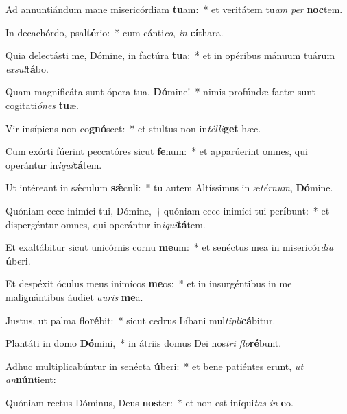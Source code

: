 \item Ad annuntiándum mane misericórdiam \textbf{tu}am:~* et veritátem tu\textit{am} \textit{per} \textbf{noc}tem.
\item In decachórdo, psal\textbf{té}rio:~* cum cánti\textit{co}, \textit{in} \textbf{cí}thara.
\item Quia delectásti me, Dómine, in factúra \textbf{tu}a:~* et in opéribus mánuum tuárum \textit{ex}\textit{sul}\textbf{tá}bo.
\item Quam magnificáta sunt ópera tua, \textbf{Dó}mine!~* nimis profúndæ factæ sunt cogitati\textit{ó}\textit{nes} \textbf{tu}æ.
\item Vir insípiens non co\textbf{gnó}scet:~* et stultus non in\textit{tél}\textit{li}\textbf{get} hæc.
\item Cum exórti fúerint peccatóres sicut \textbf{fe}num:~* et apparúerint omnes, qui operántur in\textit{i}\textit{qui}\textbf{tá}tem.
\item Ut intéreant in sǽculum \textbf{sǽ}culi:~* tu autem Altíssimus in æ\textit{tér}\textit{num}, \textbf{Dó}mine.
\item Quóniam ecce inimíci tui, Dómine,~† quóniam ecce inimíci tui per\textbf{í}bunt:~* et dispergéntur omnes, qui operántur in\textit{i}\textit{qui}\textbf{tá}tem.
\item Et exaltábitur sicut unicórnis cornu \textbf{me}um:~* et senéctus mea in misericór\textit{di}\textit{a} \textbf{ú}beri.
\item Et despéxit óculus meus inimícos \textbf{me}os:~* et in insurgéntibus in me malignántibus áudiet \textit{au}\textit{ris} \textbf{me}a.
\item Justus, ut palma flo\textbf{ré}bit:~* sicut cedrus Líbani mul\textit{ti}\textit{pli}\textbf{cá}bitur.
\item Plantáti in domo \textbf{Dó}mini,~* in átriis domus Dei nos\textit{tri} \textit{flo}\textbf{ré}bunt.
\item Adhuc multiplicabúntur in senécta \textbf{ú}beri:~* et bene patiéntes erunt, \textit{ut} \textit{an}\textbf{nún}tient:
\item Quóniam rectus Dóminus, Deus \textbf{nos}ter:~* et non est iníqui\textit{tas} \textit{in} \textbf{e}o.
